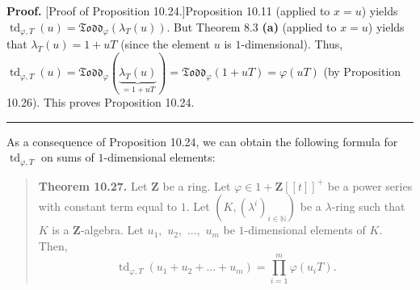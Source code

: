 \documentclass[numbers=enddot,12pt,final,onecolumn,notitlepage]{scrartcl}%
\newenvironment{proof}[1][Proof]{\noindent\textbf{#1.} }{\ \rule{0.5em}{0.5em}}
\begin{document}
\begin{proof}
[Proof of Proposition 10.24.]Proposition 10.11 (applied to $x=u$) yields
$\operatorname*{td}\nolimits_{\varphi,T}\left(  u\right)  =\mathfrak{Todd}%
_{\varphi}\left(  \lambda_{T}\left(  u\right)  \right)  $. But Theorem 8.3
\textbf{(a)} (applied to $x=u$) yields that $\lambda_{T}\left(  u\right)
=1+uT$ (since the element $u$ is $1$-dimensional). Thus, $\operatorname*{td}%
\nolimits_{\varphi,T}\left(  u\right)  =\mathfrak{Todd}_{\varphi}\left(
\underbrace{\lambda_{T}\left(  u\right)  }_{=1+uT}\right)  =\mathfrak{Todd}%
_{\varphi}\left(  1+uT\right)  =\varphi\left(  uT\right)  $ (by Proposition
10.26). This proves Proposition 10.24.
\end{proof}

As a consequence of Proposition 10.24, we can obtain the following formula for
$\operatorname*{td}\nolimits_{\varphi,T}$ on sums of $1$-dimensional elements:

\begin{quote}
\textbf{Theorem 10.27.} Let $\mathbf{Z}$ be a ring. Let $\varphi
\in1+\mathbf{Z}\left[  \left[  t\right]  \right]  ^{+}$ be a power series with
constant term equal to $1$. Let $\left(  K,\left(  \lambda^{i}\right)
_{i\in\mathbb{N}}\right)  $ be a $\lambda$-ring such that $K$ is a
$\mathbf{Z}$-algebra. Let $u_{1},$ $u_{2},$ $...,$ $u_{m}$ be $1$-dimensional
elements of $K$. Then,%
\[
\operatorname*{td}\nolimits_{\varphi,T}\left(  u_{1}+u_{2}+...+u_{m}\right)
=\prod\limits_{i=1}^{m}\varphi\left(  u_{i}T\right)  .
\]



\end{quote}
\end{document}
